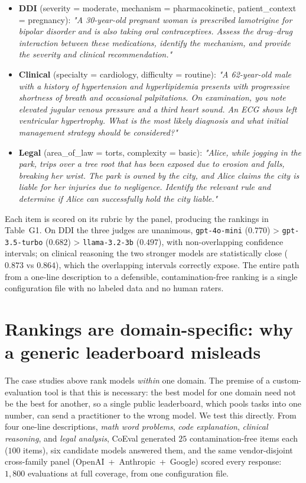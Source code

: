 \begin{itemize}
\tightlist
\item
  \textbf{DDI} (severity = moderate, mechanism = pharmacokinetic, patient\_context = pregnancy):
  \emph{"A 30-year-old pregnant woman is prescribed lamotrigine for bipolar disorder and is also taking oral
  contraceptives. Assess the drug--drug interaction between these medications, identify the mechanism, and provide
  the severity and clinical recommendation."}
\item
  \textbf{Clinical} (specialty = cardiology, difficulty = routine):
  \emph{"A 62-year-old male with a history of hypertension and hyperlipidemia presents with progressive shortness of
  breath and occasional palpitations. On examination, you note elevated jugular venous pressure and a third heart
  sound. An ECG shows left ventricular hypertrophy. What is the most likely diagnosis and what initial management
  strategy should be considered?"}
\item
  \textbf{Legal} (area\_of\_law = torts, complexity = basic):
  \emph{"Alice, while jogging in the park, trips over a tree root that has been exposed due to erosion and falls,
  breaking her wrist. The park is owned by the city, and Alice claims the city is liable for her injuries due to
  negligence. Identify the relevant rule and determine if Alice can successfully hold the city liable."}
\end{itemize}

Each item is scored on its rubric by the panel, producing the rankings in Table~G1. On DDI the three judges are
unanimous, \texttt{gpt-4o-mini} (\(0.770\)) \textgreater{} \texttt{gpt-3.5-turbo} (\(0.682\)) \textgreater{}
\texttt{llama-3.2-3b} (\(0.497\)), with non-overlapping confidence intervals; on clinical reasoning the two stronger
models are statistically close (\(0.873\) vs \(0.864\)), which the overlapping intervals correctly expose. The entire path
from a one-line description to a defensible, contamination-free ranking is a single configuration file with no labeled
data and no human raters.

\section{Rankings are domain-specific: why a generic leaderboard misleads}\label{appD}

The case studies above rank models \emph{within} one domain. The premise of a custom-evaluation tool is that this
is necessary: the best model for one domain need not be the best for another, so a single public leaderboard, which
pools tasks into one number, can send a practitioner to the wrong model. We test this directly. From four one-line
descriptions, \emph{math word problems}, \emph{code explanation}, \emph{clinical reasoning}, and \emph{legal
analysis}, CoEval generated \(25\) contamination-free items each (\(100\) items), six candidate models answered them,
and the same vendor-disjoint cross-family panel (OpenAI~+~Anthropic~+~Google) scored every
response: \(1{,}800\) evaluations at full coverage, from one configuration file.

